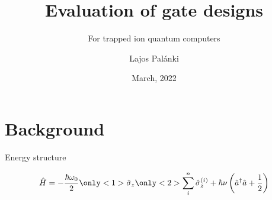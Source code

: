 \documentclass[aspectratio=169]{beamer}
\title{Evaluation of gate designs} %
\subtitle{For trapped ion quantum computers}
\author[L. Pal\' anki]{Lajos Pal\' anki}
\institute[ICL]{
    Department of Physics%
    \\%
    Imperial College London%
} %
\date{March, 2022}
\begin{document}
    
    \frame{\titlepage}
    
    
    
    
    
    \section{Background}
	\begin{frame}{Energy structure}
		\begin{figure}
			\centering
			\[\hat{H}=-\frac{\hbar\omega_0}{2}\only<1>{\hat{\sigma}_z}\only<2>{\sum_i^n\hat{\sigma}_z^{(i)}} + \hbar\nu \left(\hat{a}^\dagger\hat{a} + \frac{1}{2}\right)\]
		\end{figure}
	\end{frame}
\end{document}
